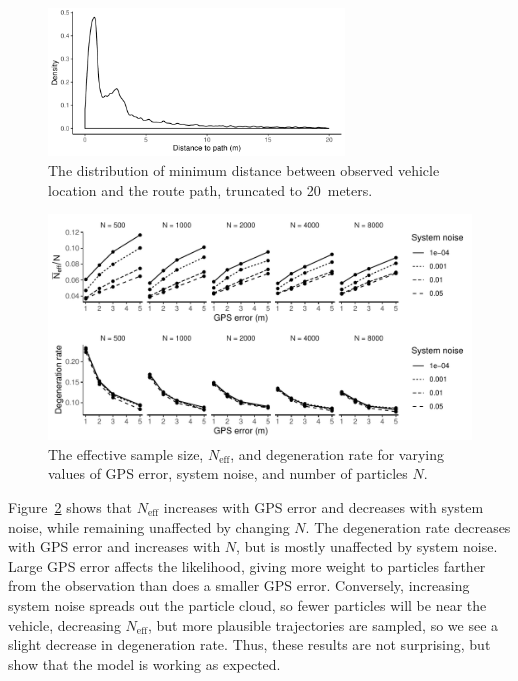 \begin{figure}[tb]
    \centering
    \includegraphics[width=0.7\textwidth]{figures/04_model_results_dist.pdf}
    \caption{
        The distribution of minimum distance between observed vehicle location
        and the route path, truncated to 20~meters.
    }
    \label{fig:dist_to_route}
\end{figure}


\begin{figure}[tb]
    \centering
    \includegraphics[width=\textwidth]{figures/04_model_results_neff.pdf}
    \caption{
        The effective sample size, $N_\text{eff}$,
        and degeneration rate for varying values of GPS error,
        system noise, and number of particles $N$.
    }
    \label{fig:perf_stats}
\end{figure}


Figure~\ref{fig:perf_stats} shows that $N_\text{eff}$ increases
with GPS error and decreases with system noise,
while remaining unaffected by changing $N$.
The degeneration rate decreases with GPS error and increases with $N$,
but is mostly unaffected by system noise.
Large GPS error affects the likelihood,
giving more weight to particles farther from the observation
than does a smaller GPS error.
Conversely, increasing system noise spreads out the particle cloud,
so fewer particles will be near the vehicle,
decreasing $N_\text{eff}$,
but more plausible trajectories are sampled,
so we see a slight decrease in degeneration rate.
Thus, these results are not surprising, 
but show that the model is working as expected.


